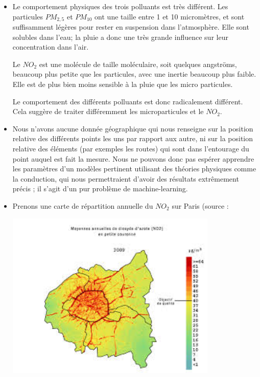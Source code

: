 \begin{itemize}
  \item
    Le comportement physiques des trois polluants est très différent.
    Les particules $PM_{2,5}$ et $PM_{10}$ ont une taille entre 1 et 10 micromètres, et sont suffisamment légères pour rester en suspension dans l'atmosphère. Elle sont solubles dans l'eau; la pluie a donc une très grande influence sur leur concentration dans l'air.
    
    Le $NO_2$ est une molécule de taille moléculaire, soit quelques angströms, beaucoup plus petite que les particules, avec une inertie beaucoup plus faible. Elle est de plus bien moins sensible à la pluie que les micro particules.
    
    Le comportement des différents polluants est donc radicalement différent.
    Cela suggère de traiter différemment les microparticules et le $NO_2$.
  \item
    Nous n'avons aucune donnée géographique qui nous renseigne sur la position relative des différents points les uns par rapport aux autre, ni sur la position relative des éléments (par exemples les routes) qui sont dans l'entourage du point auquel est fait la mesure.
   Nous ne pouvons donc pas espérer apprendre les paramètres d'un modèles pertinent utilisant des théories physiques comme la conduction, qui nous permettraient d'avoir des résultats extrêmement précis ; il s'agit d'un pur problème de machine-learning.
	\item
    	Prenons une carte de répartition annuelle du $NO_2$ sur Paris (source : %
    \begin{center}
    	\includegraphics[height=8cm]{images/parisno2.jpg}
    \end{center}

\end{itemize}
